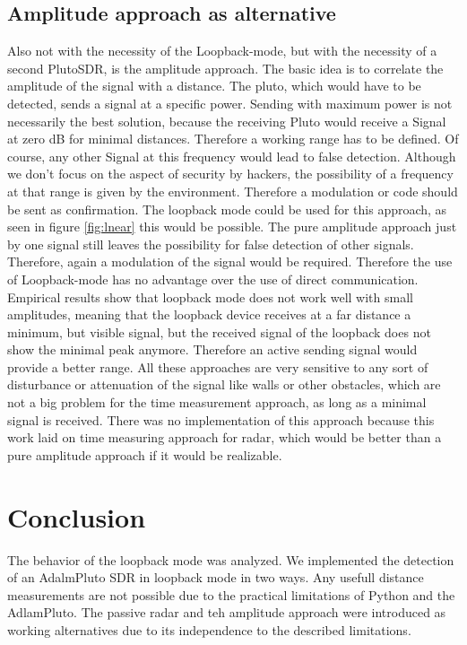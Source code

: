 \documentclass[journal]{IEEEtran}
\begin{document}
\subsection{Amplitude approach as alternative}
\label{sec:Alternatives2}
Also not with the necessity of the Loopback-mode, but with the necessity of a second PlutoSDR, is the amplitude approach. The basic idea is to correlate the amplitude of the signal with a distance. The pluto, which would have to be detected, sends a signal at a specific power. Sending with maximum power is not necessarily the best solution, because the receiving Pluto would receive a Signal at zero dB for minimal distances. Therefore a working range has to be defined. Of course, any other Signal at this frequency would lead to false detection. Although we don't focus on the aspect of security by hackers, the possibility of a frequency at that range is given by the environment. Therefore a modulation or code should be sent as confirmation. 
The loopback mode could be used for this approach, as seen in figure \ref{fig:lnear} this would be possible. The pure amplitude approach just by one signal still leaves the possibility for false detection of other signals. Therefore, again a modulation of the signal would be required. 
Therefore the use of Loopback-mode has no advantage over the use of direct communication. Empirical results show that loopback mode does not work well with small amplitudes, meaning that the loopback device receives at a far distance a minimum, but visible signal, but the received signal of the loopback does not show the minimal peak anymore. Therefore an active sending signal would provide a better range.
All these approaches are very sensitive to any sort of disturbance or attenuation of the signal like walls or other obstacles, which are not a big problem for the time measurement approach, as long as a minimal signal is received.
There was no implementation of this approach because this work laid on time measuring approach for radar, which would be better than a pure amplitude approach if it would be realizable. 


\section{Conclusion}
\label{sec:conclusion}
The behavior of the loopback mode was analyzed.
We implemented the detection of an AdalmPluto SDR in loopback mode in two ways.
Any usefull distance measurements are not possible due to the practical limitations of Python and the AdlamPluto.
The passive radar and teh amplitude approach were introduced as working alternatives due to its independence to the described limitations. 




\appendices




\end{document}
